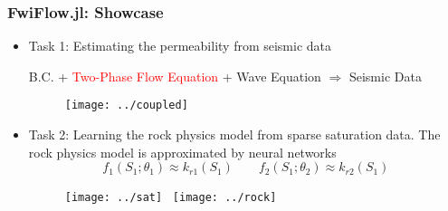 \documentclass[usenames,dvipsnames]{beamer}
\begin{document}
\begin{frame}
	\frametitle{FwiFlow.jl: Showcase}
	\begin{itemize}
		\item Task 1: Estimating the permeability from seismic data 
		\begin{center}
	B.C. +	\textcolor{red}{Two-Phase Flow Equation} + Wave Equation $\Rightarrow$ Seismic Data
	\end{center}
		\begin{figure}[hbt]
		\centering
  \texttt{[image: ../coupled]}
\end{figure}
\item Task 2: Learning the rock physics model from sparse saturation data. The rock physics model is approximated by neural networks  
{\scriptsize$$f_1(S_1; \theta_1) \approx k_{r1}(S_1)\qquad f_2(S_1; \theta_2) \approx k_{r2}(S_1)$$}
\vspace{-0.4cm}
\begin{figure}
	\centering
	\texttt{[image: ../sat]}~
  \texttt{[image: ../rock]}
\end{figure}
	\end{itemize}
\end{frame}
\end{document}
